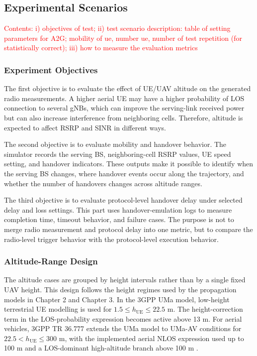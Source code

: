 \subsection{Experimental Scenarios}

\textcolor{red}{Contents: i) objectives of test; ii) test scenario description: table of setting parameters for A2G; mobility of ue, number ue, number of test repetition (for statistically correct); iii) how to measure the evaluation metrics}
\subsubsection{Experiment Objectives}

The first objective is to evaluate the effect of UE/UAV altitude on the generated radio measurements. A higher aerial UE may have a higher probability of LOS connection to several gNBs, which can improve the serving-link received power but can also increase interference from neighboring cells. Therefore, altitude is expected to affect RSRP and SINR in different ways.

The second objective is to evaluate mobility and handover behavior. The simulator records the serving BS, neighboring-cell RSRP values, UE speed setting, and handover indicators. These outputs make it possible to identify when the serving BS changes, where handover events occur along the trajectory, and whether the number of handovers changes across altitude ranges.

The third objective is to evaluate protocol-level handover delay under selected delay and loss settings. This part uses handover-emulation logs to measure completion time, timeout behavior, and failure cases. The purpose is not to merge radio measurement and protocol delay into one metric, but to compare the radio-level trigger behavior with the protocol-level execution behavior.

\subsubsection{Altitude-Range Design}

The altitude cases are grouped by height intervals rather than by a single fixed UAV height. This design follows the height regimes used by the propagation models in Chapter 2 and Chapter 3. In the 3GPP UMa model, low-height terrestrial UE modelling is used for \(1.5\le h_{\mathrm{UE}}\le22.5\) m. The height-correction term in the LOS-probability expression becomes active above 13 m. For aerial vehicles, 3GPP TR 36.777 extends the UMa model to UMa-AV conditions for \(22.5<h_{\mathrm{UE}}\le300\) m, with the implemented aerial NLOS expression used up to 100 m and a LOS-dominant high-altitude branch above 100 m \cite{3gpp_38901,3gpp_36777}.

